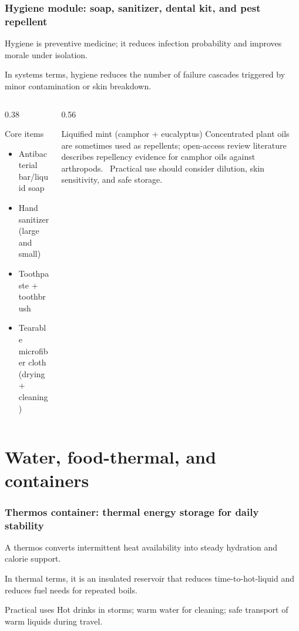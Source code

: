 \begin{frame}[t,shrink=2]
  \frametitle{Hygiene module: soap, sanitizer, dental kit, and pest repellent}
  \justifying
   Hygiene is preventive medicine; it reduces infection probability and improves morale under isolation.

  \vspace{0.5em}
   In systems terms, hygiene reduces the number of failure cascades triggered by minor contamination or skin breakdown.

  \vspace{0.8em}
  \begin{columns}[T,totalwidth=\textwidth]
    \begin{column}{0.38\textwidth}
      \begin{block}{Core items}
        \begin{itemize}
          \item Antibacterial bar/liquid soap
          \item Hand sanitizer (large and small)
          \item Toothpaste + toothbrush
          \item Tearable microfiber cloth (drying + cleaning)
        \end{itemize}
      \end{block}
    \end{column}
    \begin{column}{0.56\textwidth}
      \begin{block}{Liquified mint (camphor + eucalyptus)}
        Concentrated plant oils are sometimes used as repellents; open-access review literature describes repellency evidence for camphor oils against arthropods.~\cite{camphor_repellent_2019} Practical use should consider dilution, skin sensitivity, and safe storage.
      \end{block}
    \end{column}
  \end{columns}
\end{frame}

\section{Water, food-thermal, and containers}

\begin{frame}[t]
  \frametitle{Thermos container: thermal energy storage for daily stability}
  \justifying
   A thermos converts intermittent heat availability into steady hydration and calorie support.

  \vspace{0.5em}
   In thermal terms, it is an insulated reservoir that reduces time-to-hot-liquid and reduces fuel needs for repeated boils.

  \vspace{0.8em}
  \begin{block}{Practical uses}
    Hot drinks in storms; warm water for cleaning; safe transport of warm liquids during travel.
  \end{block}
\end{frame}

